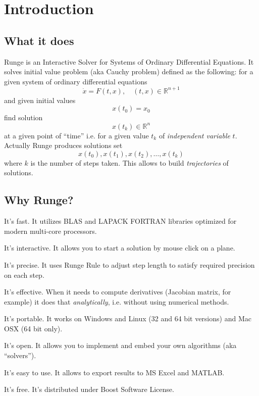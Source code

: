 \documentclass[12pt]{article}
\newcommand{\FORTRAN}{\textsf{FORTRAN}\xspace}
\begin{document}



\section{Introduction}
\subsection{What it does}
Runge is an Interactive Solver for Systems of 
Ordinary Differential Equations. It solves initial 
value problem (aka Cauchy problem) defined as the following:
for a given system of ordinary differential equations
\[
\dot x=F(t,x),\quad (t,x)\in \mathbb R^{n+1}
\]
and given initial values
\[
x(t_0)=x_0
\]
find solution 
\[
x(t_k)\in\mathbb R^n
\] 
at a given point of ``time'' i.e. for a given value \(t_k\) of \textit{independent variable} \(t\). 
Actually Runge produces solutions set
\[
x(t_0),x(t_1),x(t_2),\dots,x(t_k)
\]
where \(k\) is the number of steps taken. This allows to build 
\textit{trajectories} of solutions.


\subsection{Why Runge?}
\begin{compactitem}
\item It's fast. It utilizes BLAS and LAPACK \FORTRAN libraries optimized
for modern multi-core processors.
\item It's interactive. It allows you to start a solution by mouse click on a plane.
\item It's precise. It uses Runge Rule to adjust step length to satisfy required precision on each step.
\item It's effective. When it needs to compute derivatives (Jacobian matrix, for example) 
it does that \textit{analytically}, i.e. without using numerical methods.
\item It's portable. It works on Windows and Linux (32 and 64 bit versions) and Mac OSX (64 bit only).
\item It's open. It allows you to implement and embed your own algorithms (aka ``solvers'').
\item It's easy to use. It allows to export results to MS Excel and MATLAB.
\item It's free. It's distributed under 
\Link[http://www.boost.org/LICENSE_1_0.txt target="_blank"]{}{}Boost Software License\EndLink.
\end{compactitem}
\end{document}

